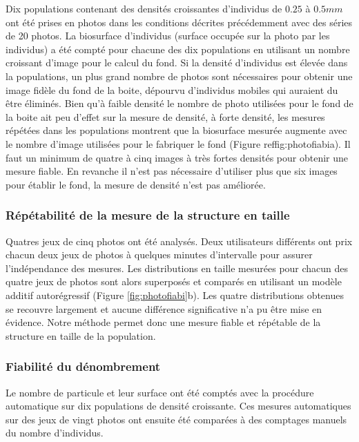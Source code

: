 Dix populations contenant des densités croissantes d'individus de $0.25$ à
$0.5mm$ ont été prises en photos dans les conditions décrites précédemment avec
des séries de 20 photos. La biosurface d'individus (surface occupée sur la photo
par les individus) a été compté pour chacune des dix populations en utilisant un
nombre croissant d'image pour le calcul du fond. Si la densité d'individus est
élevée dans la populations, un plus grand nombre de photos sont nécessaires pour
obtenir une image fidèle du fond de la boite, dépourvu d'individus mobiles qui
auraient du être éliminés. Bien qu'à faible densité le nombre de photo utilisées
pour le fond de la boite ait peu d'effet sur la mesure de densité, à forte
densité, les mesures répétées dans les populations montrent que la biosurface
mesurée augmente avec le nombre d'image utilisées pour le fabriquer le fond
(Figure ref{fig:photofiabi}a). Il faut un minimum de quatre à cinq images à très
fortes densités pour obtenir une mesure fiable. En revanche il n'est pas
nécessaire d'utiliser plus que six images pour établir le fond, la mesure
de densité n'est pas améliorée. 

\subsubsection{Répétabilité de la mesure de la structure en taille}

Quatres jeux de cinq photos ont été analysés. Deux utilisateurs différents ont
prix chacun deux jeux de photos à quelques minutes d'intervalle pour assurer
l'indépendance des mesures. Les distributions en taille mesurées pour chacun des
quatre jeux de photos sont alors superposés et comparés en utilisant un modèle
additif autorégressif (Figure \ref{fig:photofiabi}b). Les quatre distributions
obtenues se recouvre largement et aucune différence significative n'a pu être
mise en évidence. Notre méthode permet donc une mesure fiable et répétable de la
structure en taille de la population.

\subsubsection{Fiabilité du dénombrement}

Le nombre de particule et leur surface ont été comptés avec la procédure
automatique sur dix populations de densité croissante. Ces mesures automatiques
sur des jeux de vingt photos ont ensuite été comparées à des comptages manuels
du nombre d'individus. 

